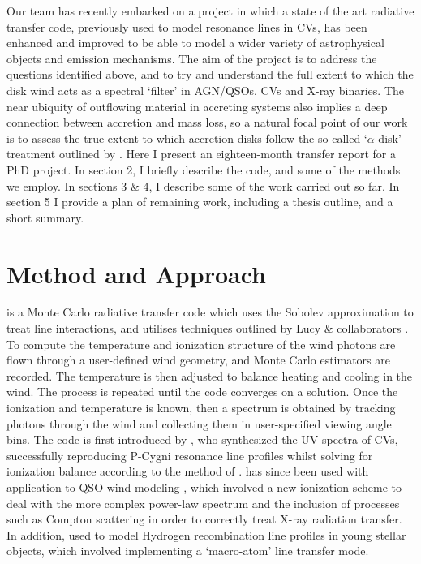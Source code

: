 \documentclass[useAMS,usenatbib,onecolumn]{mn2e2}
\begin{document}
Our team has recently embarked on a project in which a state of the art radiative transfer code, previously
used to model resonance lines in CVs, has been enhanced and improved to be able to model a wider variety of astrophysical
objects and emission mechanisms. The aim of the project is to address the questions identified above, and to try and understand the
full extent to which the disk wind acts as a spectral `filter' in AGN/QSOs, CVs and X-ray binaries.
The near ubiquity of outflowing material in accreting systems also implies a deep connection
between accretion and mass loss, so a natural focal point of our work is to assess
the true extent to which accretion disks follow the so-called `$\alpha$-disk' treatment
outlined by \cite{shakurasunyaev1973}. 
Here I present an eighteen-month transfer report for a PhD project. In section 2, I briefly describe the code, 
and some of the methods we employ. In sections 3 \& 4, I describe some of the work carried out so far. In section 5 I provide a 
plan of remaining work, including a thesis outline, and a short summary.






%
%
\section{Method and Approach}

\py is a Monte Carlo radiative transfer code which uses the Sobolev approximation to treat line interactions,
and utilises techniques outlined by Lucy \& collaborators \citep{lucy1993wolfrayet, lucy1999radeq, lucy1999sne}.
To compute the temperature and ionization structure of the wind photons are flown through
a user-defined wind geometry, and Monte Carlo estimators are recorded. The temperature is
then adjusted to balance heating and cooling in the wind. The process is repeated until
the code converges on a solution. Once the ionization and temperature is known, then a spectrum
is obtained by tracking photons through the wind and collecting them in user-specified viewing angle bins.
The code is first introduced by \cite{LK02}, who synthesized the UV spectra of CVs, successfully reproducing P-Cygni resonance line profiles
whilst solving for ionization balance according to the method of \cite{LM93}. \py has since been used with application
to QSO wind modeling \citep{higginbottom2013}, which involved a new ionization scheme to deal with the
more complex power-law spectrum and the inclusion of processes such as Compton scattering in order
to correctly treat X-ray radiation transfer. In addition, \cite{simmacro2005} used \py to model
Hydrogen recombination line profiles in young stellar objects, which involved
implementing a `macro-atom' line transfer mode. 
\end{document}
